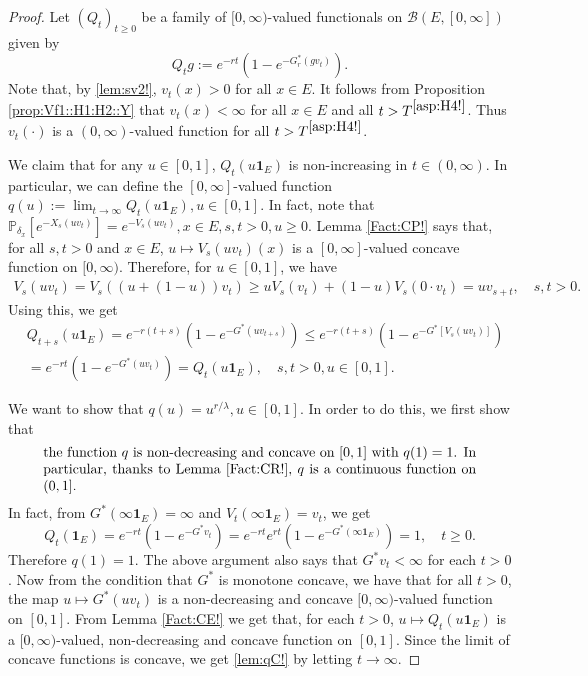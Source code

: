 \documentclass[12pt,a4paper]{amsart}
\numberwithin{equation}{section}
\theoremstyle{plain}
\theoremstyle{definition}
\theoremstyle{remark}
\begin{document}
\begin{proof}%
	Let $(Q_t)_{t\geq 0}$ be a family of $[0,\infty)$-valued functionals on $\mathcal B(E,[0,\infty])$ given by
\[
	Q_tg
	:= e^{- r t}( 1 - e^{-G_r^*(gv_t)} ).
\]
	Note that, by \eqref{lem:sv2!}, $v_t(x)>0$ for all $x\in E$.
	It follows  from Proposition \ref{prop:Vf1::H1:H2::Y} that $v_t(x)<\infty$ for all $x\in E$ and all $t> T^{\eqref{asp:H4!}}$.
	Thus $v_t(\cdot)$ is a $(0,\infty)$-valued function for all $t> T^{\eqref{asp:H4!}}$.

	We claim that for any $u \in [0,1]$, $Q_t(u \mathbf 1_E)$ is non-increasing in $t\in (0,\infty)$.
	In particular, we can define the $[0,\infty]$-valued function $q(u):= \lim_{t\to \infty} Q_t(u \mathbf 1_E), u\in [0,1]$.
	In fact, note that $\mathbb P_{\delta_x}[e^{- X_s(uv_t)}] = e^{-V_s(uv_t)},x\in E, s,t>0, u \geq 0$.
	Lemma \ref{Fact:CP!} says that, for all $s,t > 0$ and $x\in E$, $u\mapsto V_s(uv_t)(x) $ is a $[0,\infty]$-valued concave function on $[0,\infty)$.
	Therefore, for $u\in [0,1]$, we have
\begin{align}
	V_s(uv_t)
	=V_s((u+ (1-u))v_t)
	\geq uV_s(v_t) + (1-u) V_s(0\cdot v_t)
	= uv_{s+t},
	\quad s,t > 0.
\end{align}
	Using this, we get
\begin{align}
	& Q_{t+s}(u \mathbf 1_E)
	= e^{- r (t+s)} ( 1-e^{-G^*(uv_{t+s})} )
	\leq e^{- r(t+s)}( 1-e^{-G^*[V_s(uv_t)]} ) \\
	& = e^{-r t}( 1-e^{-G^*(uv_t)} )
	= Q_t(u \mathbf 1_E),
	\quad s,t > 0, u \in [0,1].
\end{align}

	We want to show that $q(u)= u^{r/\lambda}, u\in [0,1]$.
	In order to do this, we first show that
\begin{equation} \label{lem:qC!}
\begin{minipage}{0.9\textwidth}
	the function $q$ is non-decreasing and concave on $[0,1]$ with $q(1) = 1$.
	In particular, thanks to Lemma \ref{Fact:CR!}, $q$ is a continuous function on $(0,1]$.
\end{minipage}
\end{equation}
	In fact, from $G^*(\infty  \mathbf 1_E) = \infty$ and $V_t(\infty  \mathbf 1_E) = v_t$, we get
	\[
	Q_t( \mathbf 1_E)
	= e^{- r t} ( 1-e^{-G^*v_t} )
	= e^{- r t} e^{r t}( 1-e^{-G^*(\infty\mathbf 1_E)} )
	= 1,
	\quad t\geq 0.
	\]
	Therefore $q(1) = 1$.
	The above argument also says that $G^*v_t < \infty$ for each $t>0$.
	Now from the condition that $G^*$ is monotone concave, we have that for all $t>0$, the map $u \mapsto G^*(uv_t)$ is a non-decreasing and concave $[0,\infty)$-valued function on $[0,1]$.
	From Lemma \ref{Fact:CE!} we get that, for each $t> 0$, $u \mapsto Q_t(u  \mathbf 1_E)$ is a $[0,\infty)$-valued, non-decreasing and concave function on $[0,1]$.
	Since the limit of concave functions is concave, we get \eqref{lem:qC!} by letting $t\to \infty$.


\end{proof}
\end{document}
